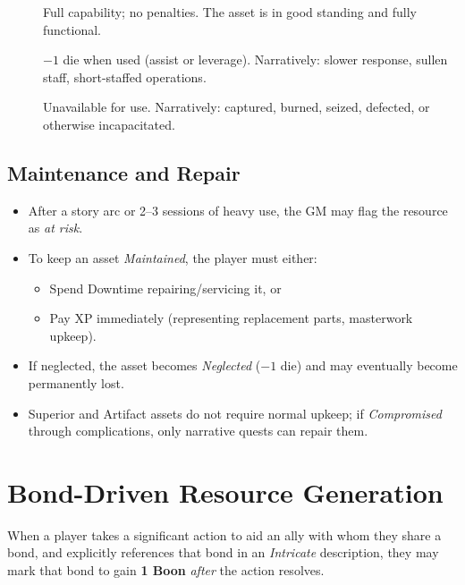 \begin{description}
\item[] Full capability; no penalties. The asset is in good standing and fully functional. 
\item[] $-1$ die when used (assist or leverage). Narratively: slower response, sullen staff, short-staffed operations. 
\item[] Unavailable for use. Narratively: captured, burned, seized, defected, or otherwise incapacitated. 
\end{description}

\subsection{Maintenance and Repair}
\label{subsec:asset-maintenance}

\begin{itemize}
\item After a story arc or 2--3 sessions of heavy use, the GM may flag the resource as \emph{at risk}. 
\item To keep an asset \emph{Maintained}, the player must either:
  \begin{itemize}
  \item Spend Downtime repairing/servicing it, or 
  \item Pay XP immediately (representing replacement parts, masterwork upkeep). 
  \end{itemize}
\item If neglected, the asset becomes \emph{Neglected} ($-1$ die) and may eventually become permanently lost. 
\item Superior and Artifact assets do not require normal upkeep; if \emph{Compromised} through complications, only narrative quests can repair them. 
\end{itemize}

\section{Bond-Driven Resource Generation}
\label{sec:bond-resources}

When a player takes a significant action to aid an ally with whom they share a bond, and explicitly references that bond in an \emph{Intricate} description, they may mark that bond to gain \textbf{1 Boon} \emph{after} the action resolves. 

